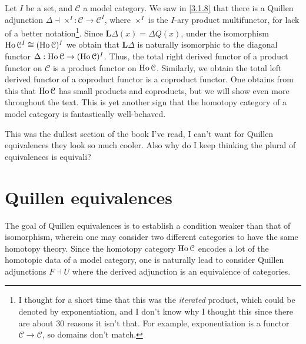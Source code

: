 \begin{example}\label{3.2.12}
	Let $I$ be a set, and $\mathcal{C} $ a model category. We saw in \cref{3.1.8} that there is a Quillen adjunction $\Delta\dashv \times ^I : \mathcal{C}  \to \mathcal{C} ^I$, where $\times ^I$ is the $I$-ary product multifunctor, for lack of a better notation\footnote{I thought for a short time that this was the \emph{iterated} product, which could be denoted by exponentiation, and I don't know why I thought this since there are about 30 reasons it isn't that. For example, exponentiation is a functor $\mathcal{C} \to \mathcal{C} $, so domains don't match.}. Since $\mathbf{L} \Delta(x) = \Delta Q(x)$, under the isomorphism $\operatorname{Ho} \mathcal{C} ^I\cong (\operatorname{Ho} \mathcal{C} )^I$ we obtain that $\mathbf{L} \Delta$ is naturally isomorphic to the diagonal functor $\Delta : \operatorname{Ho} \mathcal{C}  \to (\operatorname{Ho} \mathcal{C} )^I$. Thus, the total right derived functor of a product functor on $\mathcal{C} $ is a product functor on $\operatorname{Ho} \mathcal{C} $. Similarly, we obtain the total left derived functor of a coproduct functor is a coproduct functor. One obtains from this that $\operatorname{Ho} \mathcal{C} $ has small products and coproducts, but we will show even more throughout the text. This is yet another sign that the homotopy category of a model category is fantastically well-behaved.
\end{example}

This was the dullest section of the book I've read, I can't want for Quillen equivalences they look so much cooler. Also why do I keep thinking the plural of equivalences is equivali?

\section{Quillen equivalences}

The goal of Quillen equivalences is to establish a condition weaker than that of isomorphism, wherein one may consider two different categories to have the same homotopy theory. Since the homotopy category $\operatorname{Ho} \mathcal{C} $ encodes a lot of the homotopic data of a model category, one is naturally lead to consider Quillen adjunctions $F\dashv U$ where the derived adjunction is an equivalence of categories.

